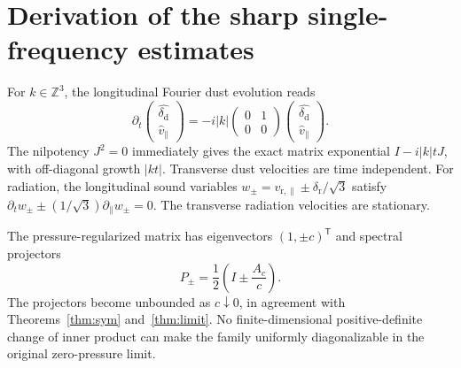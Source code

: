 \documentclass[11pt,a4paper]{article}
\newcommand{\Z}{\mathbb Z}
\begin{document}
\section{Derivation of the sharp single-frequency estimates}
For $k\in\Z^3$, the longitudinal
Fourier dust evolution reads
\[
\partial_t
\begin{pmatrix}\widehat{\delta_{\mathrm d}}\\
\widehat v_\parallel\end{pmatrix}
=-i|k|
\begin{pmatrix}0&1\\0&0\end{pmatrix}
\begin{pmatrix}\widehat{\delta_{\mathrm d}}\\
\widehat v_\parallel\end{pmatrix}.
\]
The nilpotency $J^2=0$
immediately gives the exact
matrix exponential
$I-i|k|tJ$, with off-diagonal
growth $|k t|$.
Transverse dust velocities
are time independent.
For radiation, the longitudinal
sound variables
$w_\pm=v_{{\mathrm r},\parallel}
\pm\delta_{\mathrm r}/\sqrt3$
satisfy $\partial_t w_\pm
\pm(1/\sqrt3)\partial_\parallel w_\pm=0$.
The transverse radiation
velocities are stationary.

The pressure-regularized matrix
has eigenvectors
$(1,\pm c)^\mathsf T$
and spectral projectors
\[
P_\pm=\frac12\left(I\pm\frac{A_c}{c}\right).
\]
The projectors become unbounded
as $c\downarrow0$,
in agreement with
Theorems~\ref{thm:sym} and~\ref{thm:limit}.
No finite-dimensional
positive-definite change of inner
product can make the family
uniformly diagonalizable in the
original zero-pressure limit.
\end{document}
